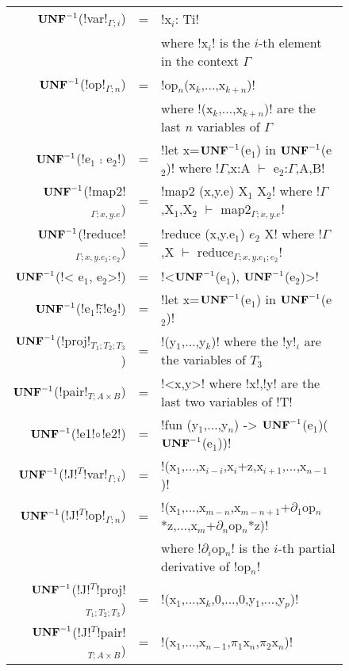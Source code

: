 \begin{figure*}[t]
    \begin{tabular}{r c l}
    $\mathbf{UNF}^{-1}$(!var!$_{\Gamma;i}$) &=& !x$_i$: Ti! \\
    && where !x$_i$! is the $i$-th element in the context $\Gamma$ \\
    $\mathbf{UNF}^{-1}$(!op!$_{\Gamma;n}$) &=& !op$_n$(x$_k$,$\ldots$,x$_{k+n}$)! \\
    && where !(x$_k$,$\ldots$,x$_{k+n}$)! are the last $n$ variables of $\Gamma$ \\ 
    $\mathbf{UNF}^{-1}$(!e$_1$ $\comp$ e$_2$!) &=& !let x=$\mathbf{UNF}^{-1}$(e$_1$) in $\mathbf{UNF}^{-1}$(e$_2$)! where !$\Gamma$,x:A $\vdash$ e$_2$:$\Gamma$,A,B! \\ 
    $\mathbf{UNF}^{-1}$(!map2!$_{\Gamma;x,y.e}$) &=& !map2 (x,y.e) X$_1$ X$_2$! where !$\Gamma$,X$_1$,X$_2$ $\vdash$ map2$_{\Gamma;x,y.e}$! \\
    $\mathbf{UNF}^{-1}$(!reduce!$_{\Gamma;x,y.e_1;e_2}$) &=& !reduce (x,y.e$_1$) $e_2$ X! where !$\Gamma$,X $\vdash$ reduce$_{\Gamma;x,y.e_1;e_2}$! \\ 
    $\mathbf{UNF}^{-1}$(!< e$_1$, e$_2$>!) &=& !<$\mathbf{UNF}^{-1}$(e$_1$), $\mathbf{UNF}^{-1}$(e$_2$)>! \\
    $\mathbf{UNF}^{-1}$(!e$_1$!$\widetilde{;}$!e$_2$!) &=& !let x=$\mathbf{UNF}^{-1}$(e$_1$) in $\mathbf{UNF}^{-1}$(e$_2$)! \\
    $\mathbf{UNF}^{-1}$(!proj!$_{T_1;T_2;T_3}$) &=& !(y$_{1}$,$\ldots$,y$_{k}$)! where the !y!$_{i}$ are the variables of $T_3$ \\
    $\mathbf{UNF}^{-1}$(!pair!$_{T;A\times B}$) &=& !<x,y>! where !x!,!y! are the last two variables of !T! \\
    $\mathbf{UNF}^{-1}$(!e1!$\circ$!e2!) &=& !fun (y$_1$,$\ldots$,y$_n$) -> $\mathbf{UNF}^{-1}$(e$_1$)($\mathbf{UNF}^{-1}$(e$_1$))! \\
    $\mathbf{UNF}^{-1}$(!J!$^T$!var!$_{\Gamma;i}$) &=& !(x$_1$,$\ldots$,x$_{i-i}$,x$_i$+z,x$_{i+1}$,$\ldots$,x$_{n-1}$)! \\
    $\mathbf{UNF}^{-1}$(!J!$^T$!op!$_{\Gamma;n}$) &=& !(x$_1$,$\ldots$,x$_{m-n}$,x$_{m-n+1}$+$\partial_1$op$_n$*z,$\ldots$,x$_m$+$\partial_n$op$_n$*z)! \\
    && where !$\partial_i$op$_n$! is the $i$-th partial derivative of !op$_n$! \\
    $\mathbf{UNF}^{-1}$(!J!$^T$!proj!$_{T_1;T_2;T_3}$) &=& !(x$_1$,$\ldots$,x$_k$,0,$\ldots$,0,y$_1$,$\ldots$,y$_p$)! \\
    $\mathbf{UNF}^{-1}$(!J!$^T$!pair!$_{T;A\times B}$) &=& !(x$_1$,$\ldots$,x$_{n-1}$,$\pi_1$x$_n$,$\pi_2$x$_n$)! \\

\end{tabular}
\end{figure*}
